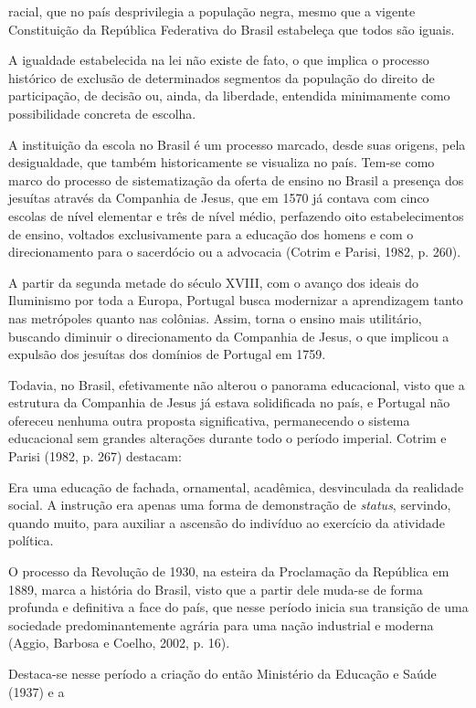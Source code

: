  racial, que no país desprivilegia a população negra, mesmo que a vigente Constituição
 da República Federativa do Brasil estabeleça que todos são iguais.\par A igualdade estabelecida na lei não existe de fato, o que implica o processo
 histórico de exclusão de determinados segmentos da população do direito de
 participação, de decisão ou, ainda, da liberdade, entendida minimamente como
 possibilidade concreta de escolha.\par A instituição da escola no Brasil é um processo marcado, desde suas origens, pela
 desigualdade, que também historicamente se visualiza no país. Tem-se como marco do
 processo de sistematização da oferta de ensino no Brasil a presença dos jesuítas
 através da Companhia de Jesus, que em 1570 já contava com cinco escolas de nível
 elementar e três de nível médio, perfazendo oito estabelecimentos de ensino, voltados
 exclusivamente para a educação dos homens e com o direcionamento para o sacerdócio ou
 a advocacia (Cotrim e Parisi, 1982, p.
 260).\par A partir da segunda metade do século XVIII, com o avanço dos ideais do Iluminismo por
 toda a Europa, Portugal busca modernizar a aprendizagem tanto nas metrópoles quanto
 nas colônias. Assim, torna o ensino mais utilitário, buscando diminuir o
 direcionamento da Companhia de Jesus, o que implicou a expulsão dos jesuítas dos
 domínios de Portugal em 1759.\par Todavia, no Brasil, efetivamente não alterou o panorama educacional, visto que a
 estrutura da Companhia de Jesus já estava solidificada no país, e Portugal não
 ofereceu nenhuma outra proposta significativa, permanecendo o sistema educacional sem
 grandes alterações durante todo o período imperial. Cotrim e Parisi (1982, p. 267) destacam:\par Era uma educação de fachada, ornamental, acadêmica, desvinculada da realidade
 social. A instrução era apenas uma forma de demonstração de
 \textit{status}, servindo, quando muito, para auxiliar a ascensão do
 indivíduo ao exercício da atividade política.\par O processo da Revolução de 1930, na esteira da Proclamação da República em 1889,
 marca a história do Brasil, visto que a partir dele muda-se de forma profunda e
 definitiva a face do país, que nesse período inicia sua transição de uma sociedade
 predominantemente agrária para uma nação industrial e moderna (Aggio, Barbosa e Coelho, 2002, p. 16).\par Destaca-se nesse período a criação do então Ministério da Educação e Saúde (1937) e a
